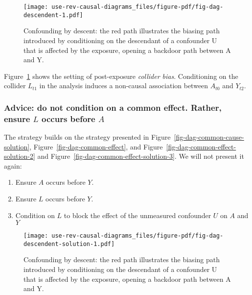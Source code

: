 \documentclass[
  singlecolumn,
  9pt]{article}
\providecommand{\tightlist}{%
  \setlength{\itemsep}{0pt}\setlength{\parskip}{0pt}}\usepackage{longtable,booktabs,array}
\begin{document}
\begin{figure}

{\centering \texttt{[image: use-rev-causal-diagrams\_files/figure-pdf/fig-dag-descendent-1.pdf]}

}

\caption{\label{fig-dag-descendent}Confounding by descent: the red path
illustrates the biasing path introduced by conditioning on the
descendant of a confounder U that is affected by the exposure, opening a
backdoor path between A and Y.}

\end{figure}

Figure~\ref{fig-dag-descendent} shows the setting of post-exposure
\emph{collider bias}. Conditioning on the collider \(L_{t1}\) in the
analysis induces a non-causal association between \(A_{t0}\) and
\(Y_{t2}\).

\subsubsection{\texorpdfstring{Advice: do not condition on a common
effect. Rather, ensure \(L\) occurs before
\(A\)}{Advice: do not condition on a common effect. Rather, ensure L occurs before A}}\label{advice-do-not-condition-on-a-common-effect.-rather-ensure-l-occurs-before-a}

The strategy builds on the strategy presented in
Figure~\ref{fig-dag-common-cause-solution},
Figure~\ref{fig-dag-common-effect}, and
Figure~\ref{fig-dag-common-effect-solution-2} and
Figure~\ref{fig-dag-common-effect-solution-3}. We will not present it
again:

\begin{enumerate}
\def\labelenumi{\arabic{enumi}.}
\tightlist
\item
  Ensure \(A\) occurs before \(Y\).
\item
  Ensure \(L\) occurs before \(Y\).
\item
  Condition on \(L\) to block the effect of the unmeasured confounder
  \(U\) on \(A\) and \(Y\)
\end{enumerate}

\begin{figure}

{\centering \texttt{[image: use-rev-causal-diagrams\_files/figure-pdf/fig-dag-descendent-solution-1.pdf]}

}

\caption{\label{fig-dag-descendent-solution}Confounding by descent: the
red path illustrates the biasing path introduced by conditioning on the
descendant of a confounder U that is affected by the exposure, opening a
backdoor path between A and Y.}

\end{figure}
\end{document}
